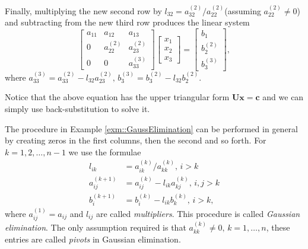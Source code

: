 \begin{exm}
    Finally, multiplying the new second row by $l_{32}=
    a_{32}^{(2)}/a_{22}^{(2)}$(assuming $a_{22}^{(2)}\neq 0$) 
    and subtracting from the new third row produces the linear
    system
    $$
    \begin{bmatrix}
        a_{11}&a_{12}&a_{13}\\
        0&a_{22}^{(2)}&a_{23}^{(2)}\\
        0&0&a_{33}^{(3)}
    \end{bmatrix}
    \begin{bmatrix}
        x_1\\x_2\\x_3
    \end{bmatrix}=
    \begin{bmatrix}
        b_1\\b_2^{(2)}\\b_3^{(3)}
    \end{bmatrix},
    $$ 
    where $a_{33}^{(3)}=a_{33}^{(2)}-l_{32}a_{23}^{(2)},\,
    b_3^{(3)}=b_3^{(2)}-l_{32}b_2^{(2)}$.

    Notice that the above equation has the upper triangular 
    form $\mathbf{U}\mathbf{x}=\mathbf{c}$ and we can simply
     use back-substitution to solve it.
\end{exm}

\begin{defn}
    The procedure in Example \ref{exm::GaussElimination} can be
    performed in general by creating zeros in the first 
    columns, then the second and so forth. For $k=1,2,\ldots,n-1$ 
    we use the formulae
    \begin{align*}
        l_{ik}&=a_{ik}^{(k)}/a_{kk}^{(k)},\,i>k\\
        a_{ij}^{(k+1)}&=a_{ij}^{(k)}-l_{ik}a_{kj}^{(k)},\,
        i,j>k\\
        b_{i}^{(k+1)}&=b_i^{(k)}-l_{ik}b_k^{(k)},\,i>k,
    \end{align*}
    where $a_{ij}^{(1)}=a_{ij}$ and $l_{ij}$ are called 
    \textit{multipliers}. This procedure is called 
    \textit{Gaussian elimination}. The only assumption required 
    is that $a_{kk}^{(k)}\neq 0,\,k=1,\ldots,n$, these entries 
    are called \textit{pivots} in Gaussian elimination.  
\end{defn}


